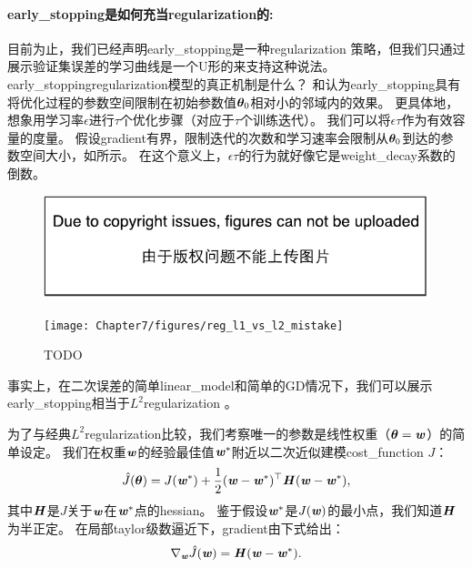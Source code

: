 \paragraph{\gls{early_stopping}是如何充当\gls{regularization}的:}
目前为止，我们已经声明\gls{early_stopping}是一种\gls{regularization} 策略，但我们只通过展示验证集误差的学习曲线是一个U形的来支持这种说法。
\gls{early_stopping}\gls{regularization}模型的真正机制是什么？ 
\cite{Bishop1995}和\cite{Sjoberg95}认为\gls{early_stopping}具有将优化过程的参数空间限制在初始参数值$\boldsymbol{\theta}_0$相对小的邻域内的效果。
更具体地，想象用学习率$\epsilon$进行$\tau$个优化步骤（对应于$\tau$个训练迭代）。
我们可以将$\epsilon \tau$作为有效容量的度量。
假设\gls{gradient}有界，限制迭代的次数和学习速率会限制从$\boldsymbol{\theta}_0$到达的参数空间大小，如所示。
在这个意义上，$\epsilon \tau$的行为就好像它是\gls{weight_decay}系数的倒数。

\begin{figure}[!htb]
\ifOpenSource
\centerline{\includegraphics{figure.pdf}}
\else
\centerline{\texttt{[image: Chapter7/figures/reg\_l1\_vs\_l2\_mistake]}}
\fi
\caption{TODO}
\label{fig:chap7_reg_l1_vs_l2_mistake}
\end{figure}

事实上，在二次误差的简单\gls{linear_model}和简单的\gls{GD}情况下，我们可以展示\gls{early_stopping}相当于$L^2$\gls{regularization} 。

为了与经典$L^2$\gls{regularization}比较，我们考察唯一的参数是线性权重（$\boldsymbol{\theta} = \boldsymbol{\mathit{w}}$）的简单设定。
我们在权重$\boldsymbol{\mathit{w}}$的经验最佳值$\boldsymbol{\mathit{w}}^*$附近以二次近似建模\gls{cost_function} $J$：
\begin{align}
 \hat J(\boldsymbol{\theta}) = J(\boldsymbol{\mathit{w}}^*) + \frac{1}{2}  (\boldsymbol{\mathit{w}}- \boldsymbol{\mathit{w}}^*)^\top \boldsymbol{\mathit{H}}  (\boldsymbol{\mathit{w}} - \boldsymbol{\mathit{w}}^*),
\end{align}
其中$\boldsymbol{\mathit{H}}$是$J$关于$\boldsymbol{\mathit{w}}$在$\boldsymbol{\mathit{w}}^*$点的\gls{hessian}。
鉴于假设$\boldsymbol{\mathit{w}}^*$是$J(\boldsymbol{\mathit{w}})$的最小点，我们知道$\boldsymbol{\mathit{H}}$为半正定。
在局部\gls{taylor}级数逼近下，\gls{gradient}由下式给出：
\begin{align}
 \nabla_{\boldsymbol{\mathit{w}}} \hat J (\boldsymbol{\mathit{w}}) = \boldsymbol{\mathit{H}} (\boldsymbol{\mathit{w}} - \boldsymbol{\mathit{w}}^*).
\end{align}


